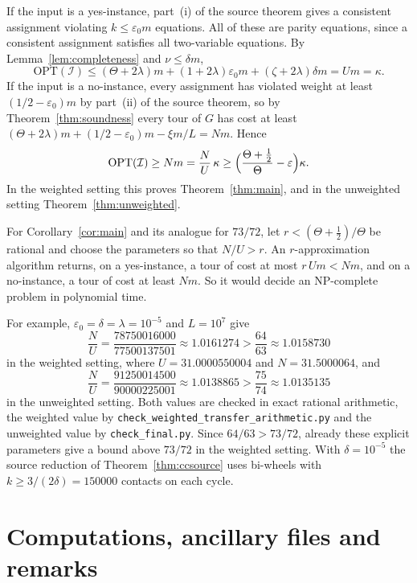 \documentclass[11pt]{amsart}
\theoremstyle{definition}
\theoremstyle{remark}
\numberwithin{equation}{section}
\newcommand{\eps}{\varepsilon}
\begin{document}
If the input is a yes-instance, part~(i) of the source theorem gives a consistent assignment violating $k\le\eps_0m$ equations. All of these are parity equations, since a consistent assignment satisfies all two-variable equations. By Lemma~\ref{lem:completeness} and $\nu\le\delta m$,
\[
\mathrm{OPT}(\mathcal I)\le(\Theta+2\lambda)m+(1+2\lambda)\eps_0m+(\zeta+2\lambda)\delta m=Um=\kappa .
\]
If the input is a no-instance, every assignment has violated weight at least $(1/2-\eps_0)m$ by part~(ii) of the source theorem, so by Theorem~\ref{thm:soundness} every tour of $G$ has cost at least $(\Theta+2\lambda)m+(1/2-\eps_0)m-\xi m/L=Nm$. Hence
\[
\mathrm{OPT}(\mathcal I)\ge Nm=\frac NU\,\kappa\ge\Bigl(\frac{\Theta+\frac12}{\Theta}-\eps\Bigr)\kappa .
\]
In the weighted setting this proves Theorem~\ref{thm:main}, and in the unweighted setting Theorem~\ref{thm:unweighted}.

For Corollary~\ref{cor:main} and its analogue for $73/72$, let $r<(\Theta+\frac12)/\Theta$ be rational and choose the parameters so that $N/U>r$. An $r$-approximation algorithm returns, on a yes-instance, a tour of cost at most $r\,Um<Nm$, and on a no-instance, a tour of cost at least $Nm$. So it would decide an NP-complete problem in polynomial time.

For example, $\eps_0=\delta=\lambda=10^{-5}$ and $L=10^{7}$ give
\[
\frac NU=\frac{78750016000}{77500137501}\approx1.0161274>\frac{64}{63}\approx1.0158730
\]
in the weighted setting, where $U=31.0000550004$ and $N=31.5000064$, and
\[
\frac NU=\frac{91250014500}{90000225001}\approx1.0138865>\frac{75}{74}\approx1.0135135
\]
in the unweighted setting. Both values are checked in exact rational arithmetic, the weighted value by \texttt{check\_weighted\_\allowbreak transfer\_\allowbreak arithmetic.py} and the unweighted value by \texttt{check\_final.py}. Since $64/63>73/72$, already these explicit parameters give a bound above $73/72$ in the weighted setting. With $\delta=10^{-5}$ the source reduction of Theorem~\ref{thm:ccsource} uses bi-wheels with $k\ge3/(2\delta)=150000$ contacts on each cycle.

\section{Computations, ancillary files and remarks}\label{sec:computation}
\end{document}
